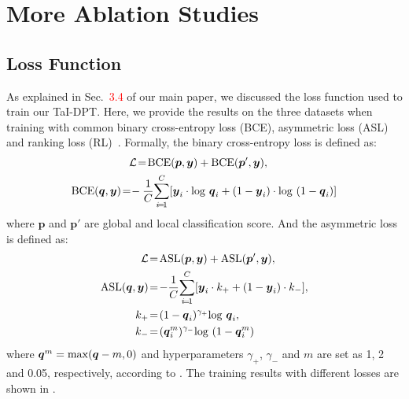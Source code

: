 \documentclass[10pt,twocolumn,letterpaper]{article}
\begin{document}
\section{More Ablation Studies}
\label{sec:ablation_supp}

\subsection{Loss Function}
\label{sec:loss}
As explained in Sec.~\textcolor{red}{3.4} of our main paper, we discussed the loss function used to train our TaI-DPT. Here, we provide the results on the three datasets when training with common binary cross-entropy loss (BCE), asymmetric loss (ASL)~\cite{benbaruch2020asymmetric} and ranking loss (RL)~\cite{rankingloss}.
Formally, the binary cross-entropy loss is defined as:
\begin{equation}
\begin{split}
&\mathcal{L} \!=\! {\rm BCE}(\boldsymbol p, \boldsymbol y) + {\rm BCE}(\boldsymbol p', \boldsymbol y), \\
  {\rm BCE}(\boldsymbol q, \boldsymbol y) \!=\!& -\frac{1}{C} { \sum_{i \!=\! 1}^{C} } {[ \boldsymbol y_i \cdot {\rm log~}\boldsymbol q_i + (1 - \boldsymbol y_i) \cdot {\rm log~}(1-\boldsymbol q_i)]}
\label{eq:bce}
\end{split}
\end{equation}
\noindent where $\boldsymbol p$ and $\boldsymbol p'$ are global and local classification score. And the asymmetric loss is defined as:
\begin{equation}
\begin{split}
\mathcal{L} &\!=\! {\rm ASL}(\boldsymbol p, \boldsymbol y) + {\rm ASL}(\boldsymbol p', \boldsymbol y), \\
  {\rm ASL}(\boldsymbol q, \boldsymbol y) &\!=\! -\frac{1}{C} { \sum_{i \!=\! 1}^{C} } {[ \boldsymbol y_i \cdot k_+ + (1 - \boldsymbol y_i) \cdot k_-]},\\
  k_+ &\!=\! (1-\boldsymbol q_i)^{\gamma_+}{\rm log~}\boldsymbol q_i,\\
  k_- &\!=\! (\boldsymbol q_i^m)^{\gamma_-}{\rm log~}(1-\boldsymbol q_i^m)
  \label{eq:asl}
\end{split}
\end{equation}
\noindent where $\boldsymbol q^m = {\rm max}(\boldsymbol q - m, 0)$ and hyperparameters $\gamma_+$, $\gamma_-$ and $m$ are set as 1, 2 and 0.05, respectively, according to \cite{dualcoop}. The training results with different losses are shown in .
\end{document}
